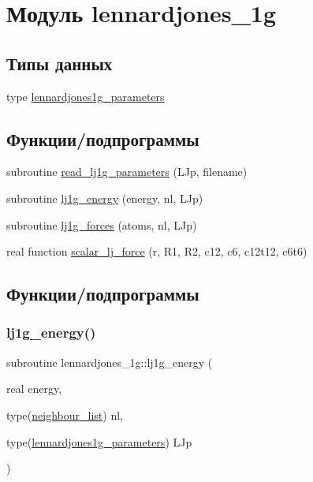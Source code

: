 \hypertarget{namespacelennardjones__1g}{}\section{Модуль lennardjones\+\_\+1g}
\label{namespacelennardjones__1g}
\subsection*{Типы данных}
\begin{DoxyCompactItemize}
\item 
type \mbox{\hyperlink{structlennardjones__1g_1_1lennardjones1g__parameters}{lennardjones1g\+\_\+parameters}}
\end{DoxyCompactItemize}
\subsection*{Функции/подпрограммы}
\begin{DoxyCompactItemize}
\item 
subroutine \mbox{\hyperlink{namespacelennardjones__1g_aaf09aeeacdbe2a76adad336dde195938}{read\+\_\+lj1g\+\_\+parameters}} (L\+Jp, filename)
\item 
subroutine \mbox{\hyperlink{namespacelennardjones__1g_ad0b0c6184262c754f7daa91a179657ef}{lj1g\+\_\+energy}} (energy, nl, L\+Jp)
\item 
subroutine \mbox{\hyperlink{namespacelennardjones__1g_a2581bad1eb2a8f6b8ecaa6d09de8f226}{lj1g\+\_\+forces}} (atoms, nl, L\+Jp)
\item 
real function \mbox{\hyperlink{namespacelennardjones__1g_a3bf6806cd81693117d84cb3f91adc6d5}{scalar\+\_\+lj\+\_\+force}} (r, R1, R2, c12, c6, c12t12, c6t6)
\end{DoxyCompactItemize}


\subsection{Функции/подпрограммы}
\mbox{\label{namespacelennardjones__1g_ad0b0c6184262c754f7daa91a179657ef}} 
\subsubsection{\texorpdfstring{lj1g\+\_\+energy()}{lj1g\_energy()}}
{\footnotesize\ttfamily subroutine lennardjones\+\_\+1g\+::lj1g\+\_\+energy (\begin{DoxyParamCaption}\item[{real}]{energy,  }\item[{type(\mbox{\hyperlink{structmd__general_1_1neighbour__list}{neighbour\+\_\+list}})}]{nl,  }\item[{type(\mbox{\hyperlink{structlennardjones__1g_1_1lennardjones1g__parameters}{lennardjones1g\+\_\+parameters}})}]{L\+Jp }\end{DoxyParamCaption})}




